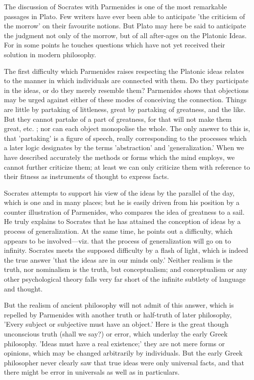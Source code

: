 \documentclass[11pt,letter]{article}
\begin{document}
\par  The discussion of Socrates with Parmenides is one of the most remarkable passages in Plato. Few writers have ever been able to anticipate 'the criticism of the morrow' on their favourite notions. But Plato may here be said to anticipate the judgment not only of the morrow, but of all after-ages on the Platonic Ideas. For in some points he touches questions which have not yet received their solution in modern philosophy.

\par  The first difficulty which Parmenides raises respecting the Platonic ideas relates to the manner in which individuals are connected with them. Do they participate in the ideas, or do they merely resemble them? Parmenides shows that objections may be urged against either of these modes of conceiving the connection. Things are little by partaking of littleness, great by partaking of greatness, and the like. But they cannot partake of a part of greatness, for that will not make them great, etc. ; nor can each object monopolise the whole. The only answer to this is, that 'partaking' is a figure of speech, really corresponding to the processes which a later logic designates by the terms 'abstraction' and 'generalization.' When we have described accurately the methods or forms which the mind employs, we cannot further criticize them; at least we can only criticize them with reference to their fitness as instruments of thought to express facts.

\par  Socrates attempts to support his view of the ideas by the parallel of the day, which is one and in many places; but he is easily driven from his position by a counter illustration of Parmenides, who compares the idea of greatness to a sail. He truly explains to Socrates that he has attained the conception of ideas by a process of generalization. At the same time, he points out a difficulty, which appears to be involved—viz. that the process of generalization will go on to infinity. Socrates meets the supposed difficulty by a flash of light, which is indeed the true answer 'that the ideas are in our minds only.' Neither realism is the truth, nor nominalism is the truth, but conceptualism; and conceptualism or any other psychological theory falls very far short of the infinite subtlety of language and thought.

\par  But the realism of ancient philosophy will not admit of this answer, which is repelled by Parmenides with another truth or half-truth of later philosophy, 'Every subject or subjective must have an object.' Here is the great though unconscious truth (shall we say?) or error, which underlay the early Greek philosophy. 'Ideas must have a real existence;' they are not mere forms or opinions, which may be changed arbitrarily by individuals. But the early Greek philosopher never clearly saw that true ideas were only universal facts, and that there might be error in universals as well as in particulars.
\end{document}
